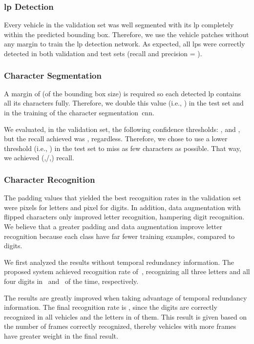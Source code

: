 \subsubsection{\gls*{lp} Detection}
Every vehicle in the validation set was well segmented with its \gls*{lp} completely within the predicted bounding box. Therefore, we use the vehicle patches without any margin to train the \gls*{lp} detection network. As expected, all \glspl*{lp} were correctly detected in both validation and test sets (recall and precision = ). 

\subsubsection{Character Segmentation}
A margin of  (of the bounding box size) is required so each detected \gls*{lp} contains all its characters fully. Therefore, we double this value (i.e., ) in the test set and in the training of the character segmentation~\gls*{cnn}. 

We evaluated, in the validation set, the following confidence thresholds: ,  and , but the recall achieved was , regardless. Therefore, we chose to use a lower threshold (i.e., ) in the test set to miss as few characters as possible. That way, we achieved  (,/,) recall.

\subsubsection{Character Recognition}

The padding values that yielded the best recognition rates in the validation set were  pixels for letters and  pixel for digits. In addition, data augmentation with flipped characters only improved letter recognition, hampering digit recognition. We believe that a greater padding and data augmentation improve letter recognition because each class have far fewer training examples, compared to digits.

We first analyzed the results without temporal redundancy information. The proposed system achieved recognition rate of~, recognizing all three letters and all four digits in~ and~ of the time, respectively. 

The results are greatly improved when taking advantage of temporal redundancy information. The final recognition rate is , since the digits are correctly recognized in all vehicles and the letters in  of them. This result is given based on the number of frames correctly recognized, thereby vehicles with more frames have greater weight in the final result.

